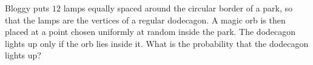 Bloggy puts $12$ lamps equally spaced around the circular border of a park, so that the lamps are the vertices of a regular dodecagon. A magic orb is then placed at a point chosen uniformly at random inside the park. The dodecagon lights up only if the orb lies inside it. What is the probability that the dodecagon lights up?
